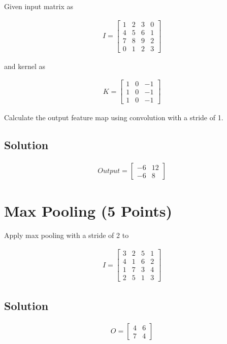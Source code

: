 \documentclass[12pt, xcolor=dvipsnames,svgnames,x11names]{article}
\begin{document}
Given input matrix  as

\begin{align*}
I = \begin{bmatrix}
1 & 2 & 3 & 0 \\
     4 & 5 & 6 & 1\\
     7 & 8 & 9 & 2\\
     0 & 1 & 2 & 3
\end{bmatrix}
\end{align*}

and kernel as

\begin{align*}
K = \begin{bmatrix}
1 & 0 & -1\\
    1 & 0 & -1\\
     1 & 0 & -1
\end{bmatrix}
\end{align*}

Calculate the output feature map using convolution with a stride of 1.

\subsection{Solution}

\begin{align*}
Output = \begin{bmatrix}
-6 & 12\\
-6 & 8
\end{bmatrix}
\end{align*}



\section{Max Pooling \hfill \textbf{(5 Points)}}
Apply max pooling with a stride of 2 to 

\begin{align*}
I = \begin{bmatrix}
 3 & 2 & 5 & 1\\
     4 & 1 & 6 & 2\\
     1 & 7 & 3 & 4\\
     2 & 5 & 1 & 3
\end{bmatrix}
\end{align*}

\subsection{Solution}

\begin{align*}
O = \begin{bmatrix}
4 & 6\\
7 & 4
\end{bmatrix}
\end{align*}
\end{document}
